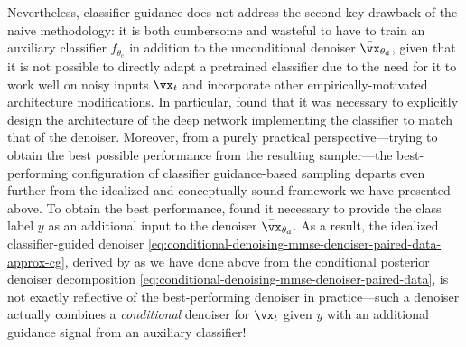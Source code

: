 \documentclass[../../book-main.tex]{subfiles}
\begin{document}
Nevertheless, classifier guidance does not address the second key drawback of
the naive methodology: it is both cumbersome and wasteful to have to
train an auxiliary classifier $f_{\theta_{\mathrm{c}}}$ in addition to the unconditional
denoiser $\bar{\vx}_{\theta_{\mathrm{d}}}$, given
that it is not possible to directly adapt a pretrained classifier
due to the need for it to work well on noisy inputs $\vx_t$ and incorporate
other empirically-motivated architecture modifications.
In particular, \citet{Dhariwal2021-hg} found that it was necessary to explicitly
design the architecture of the deep network implementing the classifier to match
that of the denoiser.
Moreover, from a purely practical perspective---trying to obtain the best
possible performance from the resulting sampler---the best-performing
configuration of classifier guidance-based sampling departs even further from
the idealized and conceptually sound framework we have presented above.
To obtain the best performance, \citet{Dhariwal2021-hg} found it
necessary to provide the class label $y$ as an additional input to the denoiser
$\bar{\vx}_{\theta_{\mathrm{d}}}$. As a result, the idealized classifier-guided
denoiser \eqref{eq:conditional-denoising-mmse-denoiser-paired-data-approx-cg},
derived by \citet{Dhariwal2021-hg} as we have done above from the conditional
posterior denoiser decomposition
\eqref{eq:conditional-denoising-mmse-denoiser-paired-data}, is not exactly
reflective of the best-performing denoiser in practice---such a denoiser
actually combines a \textit{conditional} denoiser for $\vx_t$ given $y$ with an
additional guidance signal from an auxiliary classifier!
\end{document}
